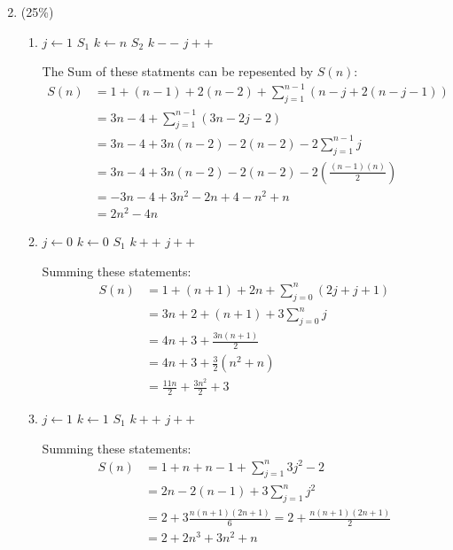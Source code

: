 \documentclass[11pt]{article}
\begin{document}
\begin{enumerate}
\setcounter{enumi}{1}

\item (25\%)
\begin{enumerate}
\item 

\begin{algorithmic}
\State $j \gets 1 $ 
 
    \State $S_1$  
	\State $k \gets n$ 
	 
		\State $S_2$ 
		\State $k--$ 
	\EndWhile
	\State $j++$ 
\EndWhile
\end{algorithmic}

The Sum of these statments can be repesented by $S(n)$:
\begin{align*}
S(n) &= 1 + (n-1) + 2(n-2) + \sum_{j=1}^{n-1} (n-j+2(n-j-1))
\\&= 3n-4 + \sum_{j=1}^{n-1}(3n-2j-2)
\\&= 3n -4 + 3n(n-2)-2(n-2) -2 \sum_{j=1}^{n-1}j
\\&= 3n -4 + 3n(n-2)-2(n-2) -2(\frac{(n-1)(n)}{2})
\\&= -3n -4 +3n^2 -2n +4 -n^2+n
\\&=2n^2 - 4n
\end{align*}
\item 
\begin{algorithmic}
\State $j \gets 0$ 
 
	\State $k \gets 0$ 
	 
		\State $S_1$ 
		\State $k++$ 
	\EndWhile
	\State $j++$ 
\EndWhile
\end{algorithmic}
Summing these statements:
\begin{align*}
S(n) &= 1 + (n+1) + 2n + \sum_{j=0}^n (2j+j+1)
\\&= 3n+2 + (n+1) + 3 \sum_{j=0}^n j
\\&= 4n+3 + \frac{3n(n+1)}{2}
\\&= 4n + 3 + \frac{3}{2} (n^2+n)
\\&= \frac{11n}{2} + \frac{3n^2}{2} + 3
\end{align*}
\newpage
\item
\begin{algorithmic}
\State $j \gets 1$ 
 
	\State $k \gets 1$ 
	 
		\State $S_1$ 
		\State $k++$ 
	\EndWhile
	\State $j++$ 
\EndWhile
\end{algorithmic}
Summing these statements:
\begin{align*}
S(n) &= 1+n+n-1+\sum_{j=1}^{n} 3j^2-2
\\&= 2n- 2(n-1) + 3\sum_{j=1}^{n} j^2
\\&= 2 + 3  \frac{n(n+1)(2n+1)}{6} = 2 + \frac{n(n+1)(2n+1)}{2}
\\&= 2+2n^3+3n^2+n
\end{align*}
\end{enumerate}
\end{enumerate}
\end{document}

